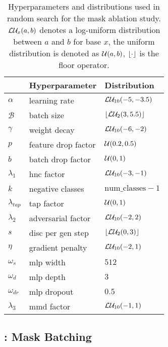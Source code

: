 \begin{table}[t]
\small
    \centering
    \begin{tabular}{lll}
        \toprule
        & \textbf{Hyperparameter} & \textbf{Distribution} \\
        \midrule
        $\alpha$ & learning rate & $\mathcal{L}\mathcal{U}_{10}(-5, -3.5)$ \\
        $\mathcal{B}$ & batch size  & $\lfloor\mathcal{L}\mathcal{U}_{2}(3, 5.5)\rfloor$ \\
        $\gamma$ & weight decay  & $\mathcal{L}\mathcal{U}_{10}(-6, -2)$ \\
        $p$ & feature drop factor  & $\mathcal{U}(0.2, 0.5)$ \\
        $b$ & batch drop factor  & $\mathcal{U}(0, 1)$ \\
        $\lambda_1$ & hnc factor & $\mathcal{L}\mathcal{U}_{10}(-3, -1)$ \\
        $k$ & negative classes & $\mathrm{num\_classes} - 1$ \\
        $\lambda_{tap}$ & tap factor & $\mathcal{U}(0, 1)$ \\
        $\lambda_2$ & adversarial factor & $\mathcal{L}\mathcal{U}_{10}(-2, 2)$ \\
        $s$ &disc per gen step & $\lfloor\mathcal{L}\mathcal{U}_{2}(0, 3)\rfloor$ \\
        $\eta$ & gradient penalty & $\mathcal{L}\mathcal{U}_{10}(-2, 1)$ \\
        $\omega_s$ & mlp width & $512$ \\
        $\omega_d$ & mlp depth & $3$ \\
        $\omega_{dr}$ & mlp dropout & $0.5$ \\
        $\lambda_3$ & mmd factor & $\mathcal{L}\mathcal{U}_{10}(-1, 1)$ \\
        \bottomrule 
    \end{tabular}
    \caption[Hyperparameters and distributions used for the mask ablation study]{Hyperparameters and distributions used in random search for the mask ablation study. $\mathcal{L}\mathcal{U}_{x}(a, b)$ denotes a log-uniform distribution between $a$ and $b$ for base $x$, the uniform distribution is denoted as $\mathcal{U}(a, b)$, $\lfloor\cdot\rfloor$ is the floor operator.}
    \label{tab:abl-distributions-mask}
\end{table}

\subsection{\divcam: Mask Batching}
\label{sec:ablation_study_batching}

